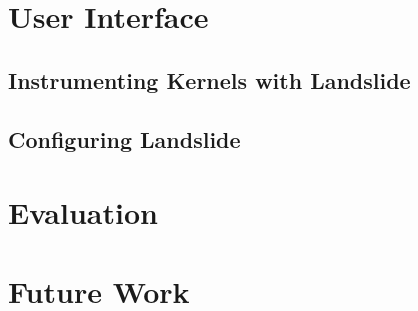\documentclass{llncs}
\begin{document}

\section{User Interface}

\subsection{Instrumenting Kernels with Landslide}
\label{sec:instrument}

\subsection{Configuring Landslide}
\label{sec:config}


\section{Evaluation}

\section{Future Work}


{}

\end{document}
